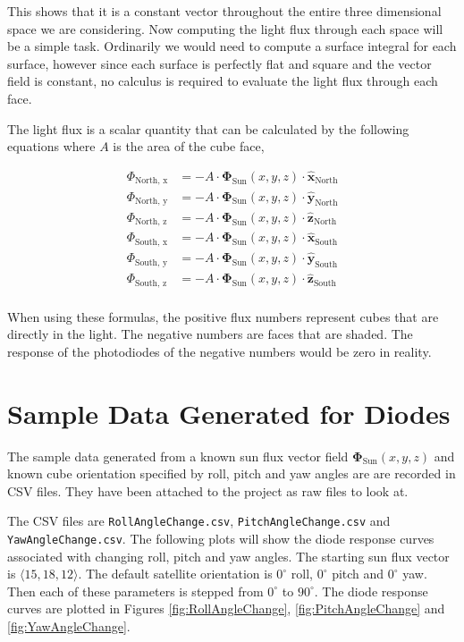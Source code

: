 \documentclass[10pt, letterpaper]{article}
\begin{document}
This shows that it is a constant vector throughout the entire three dimensional space we are considering. Now computing the light flux through each space will be a simple task. Ordinarily we would need to compute a surface integral for each surface, however since each surface is perfectly flat and square and the vector field is constant, no calculus is required to evaluate the light flux through each face.

The light flux is a scalar quantity that can be calculated by the following equations where $A$ is the area of the cube face,

\begin{align*}
    \Phi_{\text{North, x}} &= -A \cdot \mathbf{\Phi}_{\text{Sun}}(x, y, z) \cdot \mathbf{\hat{x}}_\text{North} \\
    \Phi_{\text{North, y}} &= -A \cdot \mathbf{\Phi}_{\text{Sun}}(x, y, z) \cdot \mathbf{\hat{y}}_\text{North} \\
    \Phi_{\text{North, z}} &= -A \cdot \mathbf{\Phi}_{\text{Sun}}(x, y, z) \cdot \mathbf{\hat{z}}_\text{North} \\
    \Phi_{\text{South, x}} &= -A \cdot \mathbf{\Phi}_{\text{Sun}}(x, y, z) \cdot \mathbf{\hat{x}}_\text{South} \\
    \Phi_{\text{South, y}} &= -A \cdot \mathbf{\Phi}_{\text{Sun}}(x, y, z) \cdot \mathbf{\hat{y}}_\text{South} \\
    \Phi_{\text{South, z}} &= -A \cdot \mathbf{\Phi}_{\text{Sun}}(x, y, z) \cdot \mathbf{\hat{z}}_\text{South} \\
\end{align*}

When using these formulas, the positive flux numbers represent cubes that are directly in the light. The negative numbers are faces that are shaded. The response of the photodiodes of the negative numbers would be zero in reality.

\section{Sample Data Generated for Diodes}

The sample data generated from a known sun flux vector field $\mathbf{\Phi}_{\text{Sun}}(x, y, z)$ and known cube orientation specified by roll, pitch and yaw angles are are recorded in CSV files. They have been attached to the project as raw files to look at.

The CSV files are \texttt{RollAngleChange.csv}, \texttt{PitchAngleChange.csv} and \texttt{YawAngleChange.csv}. The following plots will show the diode response curves associated with changing roll, pitch and yaw angles. The starting sun flux vector is $\langle 15, 18, 12 \rangle$. The default satellite orientation is $0^{\circ}$ roll, $0^{\circ}$ pitch and $0^{\circ}$ yaw. Then each of these parameters is stepped from $0^{\circ}$ to $90^{\circ}$. The diode response curves are plotted in Figures \ref{fig:RollAngleChange}, \ref{fig:PitchAngleChange} and \ref{fig:YawAngleChange}.
\end{document}
